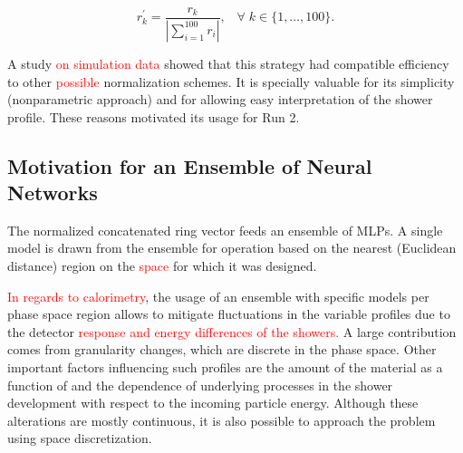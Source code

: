 \begin{equation}
  r^\prime_{k} = \frac{r_{k}}{| \sum\limits_{i=1}^{100} r_i
  |}, \;\;\;
    \forall \; k\in\{1,\dots,100\}.
\label{eq:ring_norm}
\end{equation}

A study \textcolor{red}{on simulation data} showed that this strategy had compatible
efficiency to other \textcolor{red}{possible} normalization schemes. It is specially valuable for its
simplicity (nonparametric approach) and for allowing easy interpretation of the
shower profile. These reasons motivated its usage for Run 2.

\subsection{Motivation for an Ensemble of Neural Networks}\label{top:nn_ensemble}

The normalized concatenated ring vector feeds an ensemble of MLPs. A single
model is drawn from the ensemble for operation based on the nearest (Euclidean
distance) region on the \eteta \textcolor{red}{space} for which it was designed.

\textcolor{red}{In regards to calorimetry}, the usage of an ensemble with specific models per
phase space region allows to mitigate fluctuations in the variable profiles
due to the detector \textcolor{red}{response and energy differences of the showers.}
A large contribution comes from granularity changes, which are discrete
in the phase space. Other important factors 
influencing such profiles are the
amount of the material as a function of \abseta{} and the dependence of
underlying processes in the shower development with respect to the incoming
particle energy. Although these alterations are mostly continuous, it is also
possible to approach the problem using space discretization.

